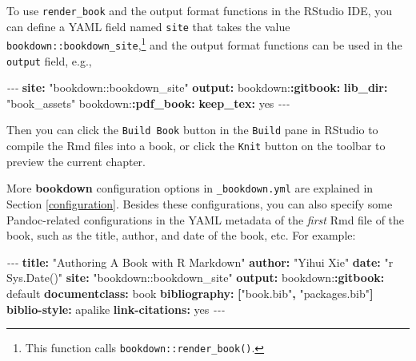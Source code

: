 \documentclass[
  12pt,
]{krantz}
\newenvironment{Shaded}{\begin{snugshade}}{\end{snugshade}}
\newcommand{\AttributeTok}[1]{\textcolor[rgb]{0.13,0.29,0.53}{#1}}
\newcommand{\CharTok}[1]{\textcolor[rgb]{0.31,0.60,0.02}{#1}}
\newcommand{\FunctionTok}[1]{\textcolor[rgb]{0.13,0.29,0.53}{\textbf{#1}}}
\newcommand{\KeywordTok}[1]{\textcolor[rgb]{0.13,0.29,0.53}{\textbf{#1}}}
\newcommand{\PreprocessorTok}[1]{\textcolor[rgb]{0.56,0.35,0.01}{\textit{#1}}}
\newcommand{\StringTok}[1]{\textcolor[rgb]{0.31,0.60,0.02}{#1}}
\theoremstyle{definition}
\theoremstyle{definition}
\theoremstyle{definition}
\theoremstyle{definition}
\theoremstyle{remark}
\begin{document}
To use \texttt{render\_book} and the output format functions in the RStudio IDE, you can define a YAML field named \texttt{site} that takes the value \texttt{bookdown::bookdown\_site},\footnote{This function calls \texttt{bookdown::render\_book()}.} and the output format functions can be used in the \texttt{output} field, e.g.,

\begin{Shaded}
\begin{Highlighting}[]
\PreprocessorTok{{-}{-}{-}}
\FunctionTok{site}\KeywordTok{:}\AttributeTok{ }\StringTok{"bookdown::bookdown\_site"}
\FunctionTok{output}\KeywordTok{:}
\AttributeTok{  bookdown:}\FunctionTok{:gitbook}\KeywordTok{:}
\AttributeTok{    }\FunctionTok{lib\_dir}\KeywordTok{:}\AttributeTok{ }\StringTok{"book\_assets"}
\AttributeTok{  bookdown:}\FunctionTok{:pdf\_book}\KeywordTok{:}
\AttributeTok{    }\FunctionTok{keep\_tex}\KeywordTok{:}\AttributeTok{ }\CharTok{yes}
\PreprocessorTok{{-}{-}{-}}
\end{Highlighting}
\end{Shaded}

Then you can click the \texttt{Build\ Book} button in the \texttt{Build} pane in RStudio to compile the Rmd files into a book, or click the \texttt{Knit} button on the toolbar to preview the current chapter.

More \textbf{bookdown} configuration options in \texttt{\_bookdown.yml} are explained in Section \ref{configuration}. Besides these configurations, you can also specify some Pandoc-related configurations in the YAML metadata of the \emph{first} Rmd file of the book, such as the title, author, and date of the book, etc. For example:

\begin{Shaded}
\begin{Highlighting}[]
\PreprocessorTok{{-}{-}{-} }
\FunctionTok{title}\KeywordTok{:}\AttributeTok{ }\StringTok{"Authoring A Book with R Markdown"}
\FunctionTok{author}\KeywordTok{:}\AttributeTok{ }\StringTok{"Yihui Xie"}
\FunctionTok{date}\KeywordTok{:}\AttributeTok{ }\StringTok{"\textasciigrave{}r Sys.Date()\textasciigrave{}"}
\FunctionTok{site}\KeywordTok{:}\AttributeTok{ }\StringTok{"bookdown::bookdown\_site"}
\FunctionTok{output}\KeywordTok{:}
\AttributeTok{  bookdown:}\FunctionTok{:gitbook}\KeywordTok{:}\AttributeTok{ default}
\FunctionTok{documentclass}\KeywordTok{:}\AttributeTok{ book}
\FunctionTok{bibliography}\KeywordTok{:}\AttributeTok{ }\KeywordTok{[}\StringTok{"book.bib"}\KeywordTok{,}\AttributeTok{ }\StringTok{"packages.bib"}\KeywordTok{]}
\FunctionTok{biblio{-}style}\KeywordTok{:}\AttributeTok{ apalike}
\FunctionTok{link{-}citations}\KeywordTok{:}\AttributeTok{ }\CharTok{yes}
\PreprocessorTok{{-}{-}{-}}
\end{Highlighting}
\end{Shaded}
\end{document}
